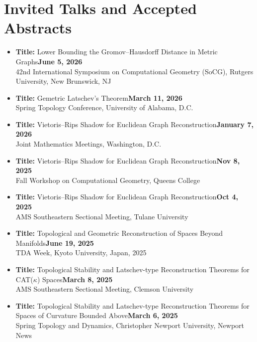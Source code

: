 \documentclass[11pt]{article}
\begin{document}
\section{Invited Talks and Accepted Abstracts}
\begin{itemize}[leftmargin=*]
  \item \textbf{Title:} Lower Bounding the Gromov--Hausdorff Distance in Metric Graphs\hfill\textbf{\footnotesize June 5, 2026}\\
  42nd International Symposium on Computational Geometry (SoCG), Rutgers University, New Brunswick, NJ

  \item \textbf{Title:} Gemetric Latschev's Theorem\hfill  \textbf{\footnotesize March 11, 2026}\\
  Spring Topology Conference, University of Alabama, D.C.

  \item \textbf{Title:} Vietoris--Rips Shadow for Euclidean Graph Reconstruction\hfill  \textbf{\footnotesize January 7, 2026}\\
  Joint Mathematics Meetings, Washington, D.C.   

  \item \textbf{Title:} Vietoris--Rips Shadow for Euclidean Graph Reconstruction\hfill  \textbf{\footnotesize Nov 8, 2025}\\
  Fall Workshop on Computational Geometry, Queens College   
  
  
  \item \textbf{Title:} Vietoris--Rips Shadow for Euclidean Graph Reconstruction\hfill  \textbf{\footnotesize Oct 4, 2025}\\
  AMS Southeastern Sectional Meeting, Tulane University 

  \item \textbf{Title:} Topological and Geometric Reconstruction of Spaces Beyond Manifolds\hfill  \textbf{\footnotesize June 19, 2025}\\
  TDA Week, Kyoto University, Japan, 2025 

  \item \textbf{Title:} Topological Stability and Latschev-type Reconstruction Theorems for CAT($\kappa$)
 Spaces\hfill  \textbf{\footnotesize March 8, 2025}\\
  AMS Southeastern Sectional Meeting, Clemson University 

  \item \textbf{Title:} Topological Stability and Latschev-type Reconstruction Theorems for Spaces of Curvature Bounded Above\hfill  \textbf{\footnotesize March 6, 2025}\\
  Spring Topology and Dynamics, Christopher Newport University, Newport News 


\end{itemize}
\end{document}
